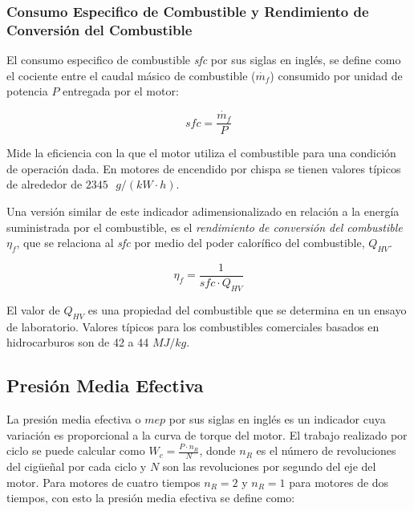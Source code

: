 


\subsubsection{Consumo Especifico de Combustible y Rendimiento de Conversión del
Combustible}
%
El consumo especifico de combustible \emph{sfc} por sus siglas en inglés, se
define como el cociente entre el caudal másico de combustible ($\dot{m_f}$)
consumido por unidad de potencia $P$ entregada por el motor:

\begin{equation}\label{eq:sfc} sfc = \frac{\dot{m_f}}{P}
\end{equation}

Mide la eficiencia con la que el motor utiliza el combustible para una condición
de operación dada.
%
En motores de encendido por chispa se tienen valores típicos de alrededor de
$2345\text{ }g/(kW\cdot h)$.

Una versión similar de este indicador adimensionalizado en relación a la energía
suministrada por el combustible, es el \emph{rendimiento de conversión del
combustible} $\eta_f$, que se relaciona al \emph{sfc} por medio del poder
calorífico del combustible, $Q_{HV}$.


\begin{equation}\label{eq:eta_f} \eta_f = \frac{1}{sfc \cdot Q_{HV}}
\end{equation}

El valor de $Q_{HV}$ es una propiedad del combustible que se determina en un
ensayo de laboratorio.
%
Valores típicos para los combustibles comerciales basados en hidrocarburos son
de 42 a 44 $MJ/kg$.


\subsection{Presión Media Efectiva}
%
La presión media efectiva o $mep$ por sus siglas en inglés es un indicador cuya
variación es proporcional a la curva de torque del motor.
%
El trabajo realizado por ciclo se puede calcular como
$W_c = \frac{P \cdot n_R}{N}$, donde $n_R$ es el número de revoluciones del
cigüeñal por cada ciclo y $N$ son las revoluciones por segundo del eje del motor.
%
Para motores de cuatro tiempos $n_R=2$ y $n_R=1$ para motores de dos tiempos,
con esto la presión media efectiva se define como:

